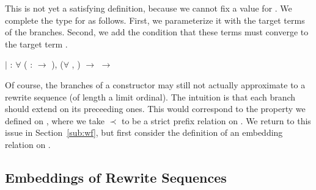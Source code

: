 This is not yet a satisfying definition, because we cannot fix a value for
. We complete the type for
 as follows. First, we
parameterize it with the target terms of the branches. Second, we add the
condition that these terms must converge to the target term
.
\begin{singlespace}
\begin{coqdoccode}
\coqdocindent{1.00em}
\ensuremath{|}  :
\ensuremath{\forall}  
( :
\ensuremath{\rightarrow} ),
(\ensuremath{\forall} , 
 ) $\rightarrow$
 
 $\rightarrow$
\coqdoceol
\end{coqdoccode}
\end{singlespace}

Of course, the branches of a 
constructor may still not actually approximate to a rewrite sequence (of
length a limit ordinal). The intuition is that each branch should extend on
its preceeding ones. This would correspond to the
 property we defined on
, where we take $\prec$ to be a
strict prefix relation on
.
We return to this issue in Section~\ref{sub:wf}, but
first consider the definition of an embedding relation on
.


\subsection{Embeddings of Rewrite Sequences}

